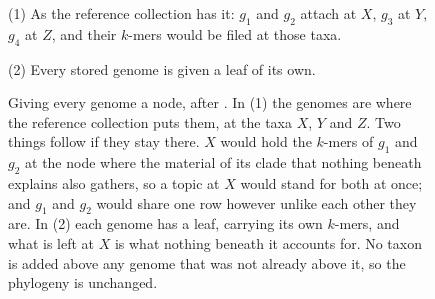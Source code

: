 \documentclass[pdflatex,sn-vancouver-num]{sn-jnl}
\begin{document}
    \begin{figure}[!htbp]
        \centering
        \small
        \begin{minipage}[c]{0.30\textwidth}
        \begin{flushleft}(1) As the reference collection has it: $g_1$ and $g_2$ attach at $X$,
        $g_3$ at $Y$, $g_4$ at $Z$, and their $k$-mers would be filed at those
        taxa.\end{flushleft}
        \end{minipage}
        \begin{minipage}[c]{0.20\textwidth}
        \end{minipage}
        \begin{minipage}[c]{0.26\textwidth}
        \end{minipage}
        \begin{minipage}[c]{0.20\textwidth}
        \begin{flushleft}(2) Every stored genome is given a leaf of its own.\end{flushleft}
        \end{minipage}
        \caption{Giving every genome a node, after \citet{genestrip-ft}. In (1) the genomes are
        where the reference collection puts them, at the taxa $X$, $Y$ and $Z$. Two things follow if
        they stay there. $X$ would hold the $k$-mers of $g_1$ and $g_2$ at the node where the
        material of its clade that nothing beneath explains also gathers, so a topic at $X$ would
        stand for both at once; and $g_1$ and $g_2$ would share one row however unlike each other
        they are. In (2) each genome has a leaf, carrying its own $k$-mers, and what is left at $X$
        is what nothing beneath it accounts for. No taxon is added above any genome that was not
        already above it, so the phylogeny is unchanged.\protect\footnotemark}\label{fttrans}
    \end{figure}
\end{document}
